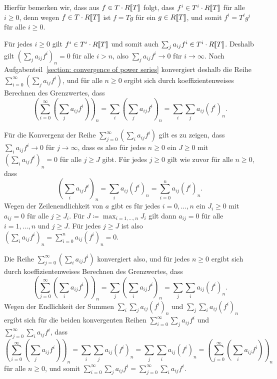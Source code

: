 \documentclass[a4paper, 10pt, numbers=noenddot]{scrartcl}
\begin{document}
Hierfür bemerken wir, dass aus $f \in T \cdot R[\![T]\!]$ folgt, dass $f^i \in T^i \cdot R[\![T]\!]$ für alle $i \geq 0$, denn wegen $f \in T \cdot R[\![T]\!]$ ist $f = T g$ für ein $g \in R[\![T]\!]$, und somit $f^i = T^i g^i$ für alle $i \geq 0$.

Für jedes $i \geq 0$ gilt $f^i \in T^i \cdot R[\![T]\!]$ und somit auch $\sum_j a_{ij} f^i \in T^i \cdot R[\![T]\!]$.
Deshalb gilt $(\sum_j a_{ij} f^i)_n = 0$ für alle $i > n$, also $\sum_j a_{ij} f^i \to 0$ für $i \to \infty$.
Nach Aufgabenteil~\ref{section: convergence of power series} konvergiert deshalb die Reihe $\sum_{i=0}^\infty (\sum_j a_{ij} f^i)$, und für alle $n \geq 0$ ergibt sich durch koeffizientenweises Berechnen des Grenzwertes, dass
\[
    \left( \sum_{i=0}^\infty \left( \sum_j a_{ij} f^i \right) \right)_{\!\!\!n}
  = \sum_i \left( \sum_j a_{ij} f^i \right)_{\!\!\!n}
  = \sum_i \sum_j a_{ij} (f^i)_n.
\]

Für die Konvergenz der Reihe $\sum_{j=0}^\infty (\sum_i a_{ij} f^i)$ gilt es zu zeigen, dass $\sum_i a_{ij} f^i \to 0$ für $j \to \infty$, dass es also für jedes $n \geq 0$ ein $J \geq 0$ mit $(\sum_i a_{ij} f^i)_n = 0$ für alle $j \geq J$ gibt.
Für jedes $j \geq 0$ gilt wie zuvor für alle $n \geq 0$, dass
\[
    \left( \sum_i a_{ij} f^i \right)_{\!\!\!n}
  = \sum_i a_{ij} (f^i)_n
  = \sum_{i=0}^n a_{ij} (f^i)_n.
\]
Wegen der Zeilenendlichkeit von $a$ gibt es für jedes $i = 0, \dotsc, n$ ein $J_i \geq 0$ mit $a_{ij} = 0$ für alle $j \geq J_i$.
Für $J \coloneqq \max_{i=1, \dotsc, n} J_i$ gilt dann $a_{ij} = 0$ für alle $i = 1, \dotsc, n$ und $j \geq J$.
Für jedes $j \geq J$ ist also $(\sum_i a_{ij} f^i)_n = \sum_{i=0}^n a_{ij} (f^i)_n = 0$.

Die Reihe $\sum_{j=0}^\infty (\sum_i a_{ij} f^i)$ konvergiert also, und für jedes $n \geq 0$ ergibt sich durch koeffizientenweises Berechnen des Grenzwertes, dass
\[
    \left( \sum_{j=0}^\infty \left( \sum_i a_{ij} f^i \right) \right)_{\!\!\!n} 
  = \sum_j \left( \sum_i a_{ij} f^i \right)_{\!\!\!n}
  = \sum_j \sum_i a_{ij} (f^i)_n.
\]
Wegen der Endlichkeit der Summen $\sum_i \sum_j a_{ij} (f^i)_n$ und $\sum_j \sum_i a_{ij} (f^i)_n$ ergibt sich für die beiden konvergenten Reihen $\sum_{i=0}^\infty \sum_j a_{ij} f^i$ und $\sum_{j=0}^\infty \sum_i a_{ij} f^i$, dass
\[
    \left( \sum_{i=0}^\infty \left( \sum_j a_{ij} f^i \right) \right)_{\!\!\!n}
  = \sum_i \sum_j a_{ij} (f^i)_n
  = \sum_j \sum_i a_{ij} (f^i)_n
  = \left( \sum_{j=0}^\infty \left( \sum_i a_{ij} f^i \right) \right)_{\!\!\!n}
\]
für alle $n \geq 0$, und somit $\sum_{i=0}^\infty \sum_j a_{ij} f^i = \sum_{j=0}^\infty \sum_i a_{ij} f^i$.
\end{document}
